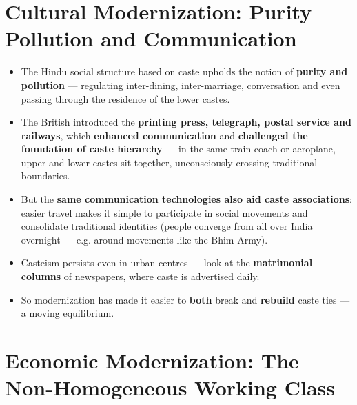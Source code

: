 \section{Cultural Modernization: Purity--Pollution and Communication}

\begin{KeyConcept}
\begin{itemize}
\item The Hindu social structure based on caste upholds the notion of \textbf{purity and pollution} --- regulating inter-dining, inter-marriage, conversation and even passing through the residence of the lower castes.
\item The British introduced the \textbf{printing press, telegraph, postal service and railways}, which \textbf{enhanced communication} and \textbf{challenged the foundation of caste hierarchy} --- in the same train coach or aeroplane, upper and lower castes sit together, unconsciously crossing traditional boundaries.
\end{itemize}
\end{KeyConcept}

\begin{KeyConcept}
\begin{itemize}
\item But the \textbf{same communication technologies also aid caste associations}: easier travel makes it simple to participate in social movements and consolidate traditional identities (people converge from all over India overnight --- e.g. around movements like the Bhim Army).
\item Casteism persists even in urban centres --- look at the \textbf{matrimonial columns} of newspapers, where caste is advertised daily.
\item So modernization has made it easier to \textbf{both} break and \textbf{rebuild} caste ties --- a moving equilibrium.
\end{itemize}
\end{KeyConcept}

\section{Economic Modernization: The Non-Homogeneous Working Class}

